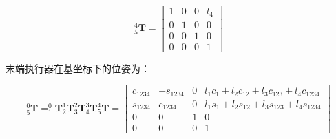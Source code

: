 \documentclass{homework}
\begin{document}
\begin{sol}
\[
  _5^4\mathbf{T} =
  \begin{bmatrix}
    1 & 0 & 0 & l_4 \\
    0 & 1 & 0 & 0 \\
    0 & 0 & 1 & 0 \\
    0 & 0 & 0 & 1
  \end{bmatrix}
\]

末端执行器在基坐标下的位姿为：

\[
  _5^0\mathbf{T} = _1^0\mathbf{T} _2^1\mathbf{T} _3^2\mathbf{T} _4^3\mathbf{T} _5^4\mathbf{T} =
  \begin{bmatrix}
    c_{1234} & -s_{1234} & 0 & l_1 c_1 + l_2 c_{12} + l_3 c_{123} + l_4 c_{1234} \\
    s_{1234} & c_{1234} & 0 & l_1 s_1 + l_2 s_{12} + l_3 s_{123} + l_4 s_{1234} \\
    0 & 0 & 1 & 0 \\
    0 & 0 & 0 & 1
  \end{bmatrix}
\]
  
\end{sol}

\question 
\end{document}
